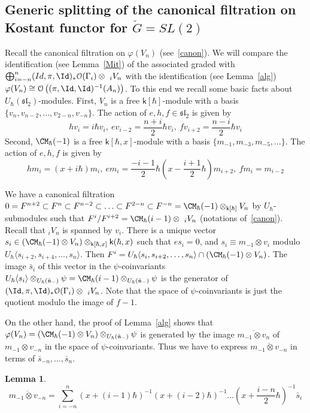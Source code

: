 \documentclass[11pt]{amsart}
\newtheorem{lem}{Lemma}
\theoremstyle{definition}
\theoremstyle{remark}
\renewcommand{\O}{{\mathcal O}}
\theoremstyle{remark}
\newcommand{\cal}{\mathcal}
\newcommand{\<}{\langle}
\renewcommand{\>}{\rangle}
\newcommand{\Ln}{\check{\mathfrak n}{}}
\newcommand{\LG}{{\check{G}}}
\renewcommand{\O}{{\cal O}}
\newcommand{\kk}{\mathsf k}
\begin{document}
\subsection{Generic splitting of the canonical filtration on Kostant functor
for $\LG=SL(2)$} Recall the canonical filtration on
$\varphi(V_n)$ (see~\ref{canon}). We will compare the identification
(see Lemma~\ref{Mit}) of the associated graded with 
$\bigoplus_{i=-n}^n(Id,\pi,\Id)_*\O(\Gamma_i)\otimes\ _iV_n$ with the
identification (see Lemma~\ref{alg}) 
$\varphi(V_n)\cong\O\left((\pi,\Id,\Id)^{-1}(A_n)\right)$.
To this end we recall some basic facts about 
$U_\hbar(\mathfrak{sl}_2)$-modules. First, $V_n$ is a free $\kk[\hbar]$-module
with a basis $\{v_n,v_{n-2},\ldots,v_{2-n},v_{-n}\}$. The action of
$e,h,f\in\mathfrak{sl}_2$ is given by
$$hv_i=i\hbar v_i,\ ev_{i-2}=\frac{n+i}{2}\hbar v_i,\
fv_{i+2}=\frac{n-i}{2}\hbar v_i$$
Second, $\CM_\hbar(-1)$ is a free $\kk[\hbar,x]$-module with a basis
$\{m_{-1},m_{-3},m_{-5},\ldots\}$. The action of $e,h,f$ is given by
$$hm_i=(x+i\hbar)m_i,\ 
em_i=\frac{-i-1}{2}\hbar(x-\frac{i+1}{2}\hbar)m_{i+2},\ 
fm_i=m_{i-2}$$

We have a canonical filtration 
$0=F^{n+2}\subset F^n\subset F^{n-2}\subset\ldots\subset
F^{2-n}\subset F^{-n}=
\CM_\hbar(-1)\otimes_{\kk[\hbar]}V_n$ by $U_\hbar$-submodules
such that $F^i/F^{i+2}=\CM_\hbar(i-1)\otimes\ _iV_n$ 
(notations of~\ref{canon}).
Recall that $_iV_n$ is spanned by $v_i$. There is a unique vector
$s_i\in(\CM_\hbar(-1)\otimes V_n)\otimes_{\kk[\hbar,x]}\kk(\hbar,x)$
such that $es_i=0$, and $s_i\equiv m_{-1}\otimes v_i$ modulo
$U_\hbar\langle s_{i+2},s_{i+4},\ldots,s_n\rangle$. 
Then $F^i=U_\hbar\langle s_i,s_{i+2},\ldots,s_n\rangle\cap
(\CM_\hbar(-1)\otimes V_n)$. The image $\bar{s}_i$ of this vector in
the $\psi$-coinvariants 
$U_\hbar\langle s_i\rangle\otimes_{U_\hbar(\Ln_-)}\psi=
\CM_\hbar(i-1)\otimes_{U_\hbar(\Ln_-)}\psi$ is the generator of 
$(\Id,\pi,\Id)_*\O(\Gamma_i)\otimes\ _iV_n$. Note that the space
of $\psi$-coinvariants is just the quotient modulo the image of $f-1$.

On the other hand, the proof of Lemma~\ref{alg} shows that
$\varphi(V_n)=
(\CM_\hbar(-1)\otimes V_n)\otimes_{U_\hbar(\Ln_-)}\psi$ is generated by
the image $\overline{m_{-1}\otimes v_n}$ of $m_{-1}\otimes v_{-n}$ in the space
of $\psi$-coinvariants. Thus we have to express 
$\overline{m_{-1}\otimes v_{-n}}$
in terms of $\bar{s}_{-n},\ldots,\bar{s}_n$.

\begin{lem}
\label{idiot}
$$\overline{m_{-1}\otimes v_{-n}}=\sum_{i=-n}^n
(x+(i-1)\hbar)^{-1}(x+(i-2)\hbar)^{-1}
\ldots\left(x+\frac{i-n}{2}\hbar\right)^{-1}
\bar{s}_i$$
\end{lem}
\end{document}
